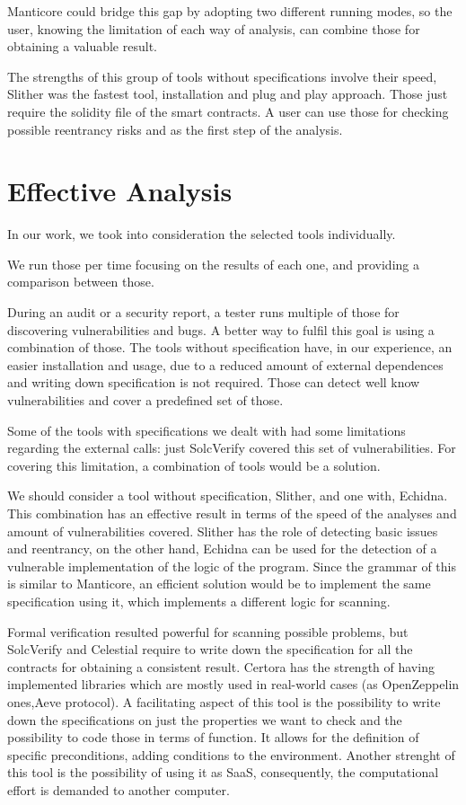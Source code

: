 Manticore could bridge this gap by adopting two different running modes, so the user, knowing the limitation of each way of analysis, can combine those for obtaining a valuable result.

The strengths of this group of tools without specifications involve their speed, Slither was the fastest tool, installation and plug and play approach. 
Those just require the solidity file of the smart contracts. A user can use those for checking possible reentrancy risks and as the first step of the analysis.

\section{Effective Analysis}
In our work, we took into consideration the selected tools individually. 

We run those per time focusing on the results of each one, and providing a comparison between those.

During an audit or a security report, a tester runs multiple of those for discovering vulnerabilities and bugs. 
A better way to fulfil this goal is using a combination of those. 
The tools without specification have, in our experience, an easier installation and usage, 
due to a reduced amount of external dependences and writing down specification is not required.
Those can detect well know vulnerabilities and cover a predefined set of those. 

Some of the tools with specifications we dealt with had some limitations regarding the external calls: just SolcVerify covered this set of vulnerabilities. 
For covering this limitation, a combination of tools would be a solution. 

We should consider a tool without specification, Slither, and one with, Echidna. 
This combination has an effective result in terms of the speed of the analyses and amount of vulnerabilities covered. 
Slither has the role of detecting basic issues and reentrancy, on the other hand, Echidna can be used for the detection of a vulnerable implementation of the logic of the program. 
Since the grammar of this is similar to Manticore, an efficient solution would be to implement the same specification using it, which implements a different logic for scanning. 

Formal verification resulted powerful for scanning possible problems, but SolcVerify and Celestial require to 
write down the specification for all the contracts for obtaining a consistent result. 
Certora has the strength of having implemented libraries which are mostly used in real-world cases (as OpenZeppelin ones,Aeve protocol). 
A facilitating aspect of this tool is the possibility to write down the specifications on just the properties we want to check and 
the possibility to code those in terms of function. It allows for the definition of specific preconditions, adding conditions to the environment. 
Another strenght of this tool is the possibility of using it as SaaS, consequently, the computational effort is demanded to another computer.

